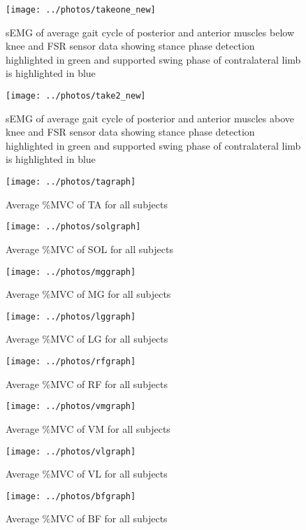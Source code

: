 \documentclass[letterpaper, 10 pt, conference]{ieeeconf}  %
\begin{document}
\begin{figure}[!h]
	\centering
	\texttt{[image: ../photos/takeone\_new]}
	\caption{sEMG of average gait cycle of posterior and anterior muscles below knee and FSR sensor data showing stance phase detection highlighted in green and supported swing phase of contralateral limb is highlighted in blue}
	\label{fig:takeonenew}
\end{figure}
\begin{figure}[!h]
	\centering
	\texttt{[image: ../photos/take2\_new]}
	\caption{sEMG of average gait cycle of posterior and anterior muscles above knee and FSR sensor data showing stance phase detection highlighted in green and supported swing phase of contralateral limb is highlighted in blue}
	\label{fig:take2new}
\end{figure}
\begin{figure}[!h]
	\centering
	\texttt{[image: ../photos/tagraph]}
	\caption{Average \%MVC of TA for all subjects}
	\label{fig:tagraph}
\end{figure}
\begin{figure}[!h]
	\centering
	\texttt{[image: ../photos/solgraph]}
	\caption{Average \%MVC of SOL for all subjects}
	\label{fig:solgraph}
\end{figure}
\begin{figure}[!h]
	\centering
	\texttt{[image: ../photos/mggraph]}
	\caption{Average \%MVC of MG for all subjects}
	\label{fig:mggraph}
\end{figure}
\begin{figure}[!h]
	\centering
	\texttt{[image: ../photos/lggraph]}
	\caption{Average \%MVC of LG for all subjects}
	\label{fig:lggraph}
\end{figure}
\begin{figure}[!h]
	\centering
	\texttt{[image: ../photos/rfgraph]}
	\caption{Average \%MVC of RF for all subjects}
	\label{fig:rfgraph}
\end{figure}
\begin{figure}[!h]
	\centering
	\texttt{[image: ../photos/vmgraph]}
	\caption{Average \%MVC of VM for all subjects}
	\label{fig:vmgraph}
\end{figure}
\begin{figure}[!h]
	\centering
	\texttt{[image: ../photos/vlgraph]}
	\caption{Average \%MVC of VL for all subjects}
	\label{fig:vlgraph}
\end{figure}
\begin{figure}[!h]
	\centering
	\texttt{[image: ../photos/bfgraph]}
	\caption{Average \%MVC of BF for all subjects}
	\label{fig:bfgraph}
\end{figure}
\end{document}
